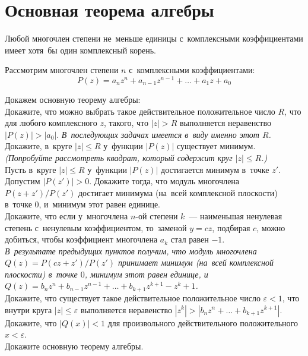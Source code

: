

\section*{Основная теорема алгебры}


\theorem
Любой многочлен степени не~меньше единицы с~комплексными коэффициентами имеет
хотя~бы один комплексный корень.

Рассмотрим многочлен степени $n$ с~комплексными коэффициентами:
\[
    P(z)
=
    a_n z^n + a_{n-1} z^{n-1} + \ldots + a_1 z + a_0
\]

\begin{problems}

\item
Докажем основную теорему алгебры:
\\
\sbp
Докажите, что можно выбрать такое действительное положительное число $R$, что
для любого комплексного $z$, такого, что $|z| > R$ выполняется неравенство
$|P(z)| > |a_0|$.
\emph{В~последующих задачах имеется в~виду именно этот $R$.}
\\
\sbp
Докажите, в~круге $|z| \leq R$ у~функции $|P(z)|$ существует минимум.
\emph{(Попробуйте рассмотреть квадрат, который содержит круг $|z| \leq R$.)}
\\
\sbp
Пусть в~круге $|z| \leq R$ у~функции $|P(z)|$ достигается минимум в~точке $z'$.
Допустим $|P(z')| > 0$.
Докажите тогда, что модуль многочлена $P(z+z') / P(z')$ достигает минимума
(на~всей комплексной плоскости) в~точке $0$, и~минимум этот равен единице.
\\
\sbp
Докажите, что если у~многочлена $n$-ой степени $k$~--- наименьшая ненулевая
степень с~ненулевым коэффициентом, то~заменой $y = c z$, подбирая $c$, можно
добиться, чтобы коэффициент многочлена $a_k$ стал равен $-1$.
\\\emph{В~результате предыдущих пунктов получим, что модуль многочлена
$Q(z) = P(c z + z') / P(z')$ принимает минимум (на~всей комплексной плоскости)
в~точке $0$, минимум этот равен единице, и
\(
    Q(z)
=
    b_n z^n + b_{n-1} z^{n-1} + \ldots + b_{k+1} z^{k+1} - z^k + 1
\).}
\\
\sbp
Докажите, что существует такое действительное положительное число
$\varepsilon < 1$, что внутри круга $|z| \leq \varepsilon$ выполняется
неравенство
$|z^k| > |b_n z^n + \ldots + b_{k+1} z^{k+1}|$.
\\
\sbp
Докажите, что $|Q(x)| < 1$ для произвольного действительного положительного
$x < \varepsilon$.
\\
\sbp
Докажите основную теорему алгебры.


\end{problems}
